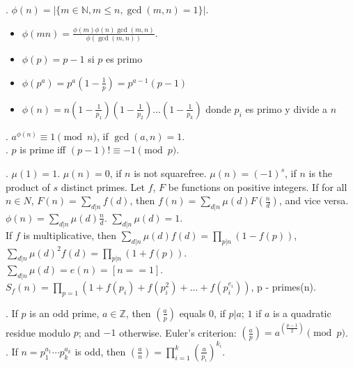 .  $\phi(n)=|\{m \in {\mathbb N}, m \le n, \gcd(m, n) = 1 \}|$.
  
\begin{itemize}
\item   $\phi(mn) = \frac{\phi(m) \phi(n) \gcd(m,n)}{\phi(\gcd(m,n))}$.
\item	$\phi(p) = p - 1$ si $p$ es primo
\item	$\phi(p^a) = p^a(1 - \frac{1}{p}) = p^{a-1} (p-1)$
\item	$\phi(n) = n(1 - \frac{1}{p_1})(1 - \frac{1}{p_2})...(1 - \frac{1}{p_k})$ donde $p_i$ es primo y divide a $n$
\end{itemize}


. $a^{\phi(n)} \equiv 1\pmod{n}$, if $\gcd(a,n)=1$. \\
. $p$ is prime iff $(p - 1)! \equiv -1 \pmod p$.

.
$\mu(1) = 1$. $\mu(n) = 0$, if $n$ is not squarefree.
$\mu(n) = (-1)^s$, if $n$ is the product of $s$ distinct primes.
Let $f$, $F$ be functions on positive integers.
If for all $n \in N$, $F(n)=\sum_{d|n} f(d)$, then $f(n) = \sum_{d|n} \mu(d) F(\frac{n}{d})$,
and vice versa. \quad
$\phi(n) = \sum_{d|n} \mu(d) \frac{n}{d}$.
\quad $\sum_{d|n} \mu(d) = 1$. \\
If $f$ is multiplicative, then $\sum_{d|n} \mu(d) f(d) = \prod_{p|n}(1-f(p))$,
$\sum_{d|n} \mu(d)^2 f(d) = \prod_{p|n} (1+f(p))$. \\
$\sum_{d|n} \mu(d) = e(n) = [n==1]$. \\
$S_{f}(n) = \prod_{p = 1} (1+f(p_i) + f(p_i^2 ) +... + f(p_i^{e_i})) $, p - primes(n). 


. If $p$ is an odd prime, $a \in {\mathbb Z}$, then
$\left(\frac{a}{p}\right)$ equals $0$, if $p | a$; $1$ if $a$ is a quadratic
residue modulo $p$; and $-1$ otherwise.
Euler's criterion:
$\left(\frac{a}{p}\right)=a^{\left(\frac{p-1}{2}\right)} \pmod p$. \\
.  %
If $n=p_1^{a_1} \cdots p_k^{a_k}$ is odd, then
$\left(\frac{a}{n}\right) = \prod_{i=1}^k \left(\frac{a}{p_i}\right)^{k_i}$.

